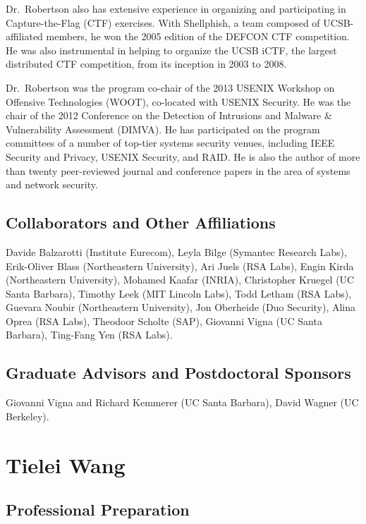 \documentclass[letterpaper,twoside,11pt,headings=small]{scrartcl}
\begin{document}
Dr.~Robertson also has extensive experience in organizing and participating in
Capture-the-Flag (CTF) exercises.  With Shellphish, a team composed of
UCSB-affiliated members, he won the 2005 edition of the DEFCON CTF
competition.  He was also instrumental in helping to organize the UCSB iCTF,
the largest distributed CTF competition, from its inception in 2003 to 2008.

Dr.~Robertson was the program co-chair of the 2013 USENIX Workshop on
Offensive Technologies (WOOT), co-located with USENIX Security.  He was the
chair of the 2012 Conference on the Detection of Intrusions and Malware \&
Vulnerability Assessment (DIMVA).  He has participated on the program
committees of a number of top-tier systems security venues, including IEEE
Security and Privacy, USENIX Security, and RAID.  He is also the author of
more than twenty peer-reviewed journal and conference papers in the area of
systems and network security.

\subsection*{Collaborators and Other Affiliations}

\noindent%
Davide Balzarotti (Institute Eurecom),
Leyla Bilge (Symantec Research Labs),
Erik-Oliver Blass (Northeastern University),
Ari Juels (RSA Labs),
Engin Kirda (Northeastern University),
Mohamed Kaafar (INRIA),
Christopher Kruegel (UC Santa Barbara),
Timothy Leek (MIT Lincoln Labs),
Todd Letham (RSA Labs),
Guevara Noubir (Northeastern University),
Jon Oberheide (Duo Security),
Alina Oprea (RSA Labs),
Theodoor Scholte (SAP),
Giovanni Vigna (UC Santa Barbara),
Ting-Fang Yen (RSA Labs).

\subsection*{Graduate Advisors and Postdoctoral Sponsors}

Giovanni Vigna and Richard Kemmerer (UC Santa Barbara), David Wagner (UC Berkeley).

\section{Tielei Wang}

\subsection*{Professional Preparation}
\end{document}
